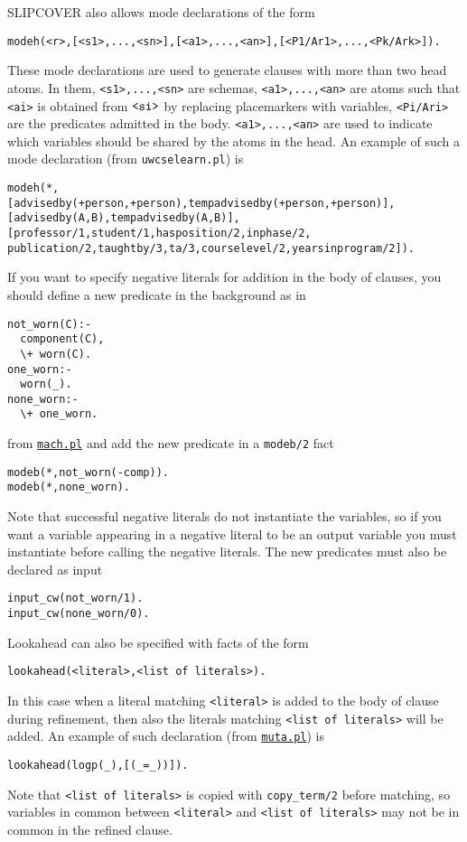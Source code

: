 SLIPCOVER also allows mode declarations of the form
\begin{verbatim}
modeh(<r>,[<s1>,...,<sn>],[<a1>,...,<an>],[<P1/Ar1>,...,<Pk/Ark>]). 
\end{verbatim}
These mode declarations are used to generate clauses with more than two head atoms. In them, \verb|<s1>,...,<sn>| are schemas,  \verb|<a1>,...,<an>| are atoms such that \verb|<ai>| is obtained from $\verb|<si>|$ by replacing placemarkers with variables, 
\verb|<Pi/Ari>| are the predicates admitted in the body. \verb|<a1>,...,<an>| are used to indicate which variables should be shared by the atoms in the head.
An example of such a mode declaration (from \texttt{uwcselearn.pl}) is
\begin{verbatim}
modeh(*,
[advisedby(+person,+person),tempadvisedby(+person,+person)],
[advisedby(A,B),tempadvisedby(A,B)],
[professor/1,student/1,hasposition/2,inphase/2,
publication/2,taughtby/3,ta/3,courselevel/2,yearsinprogram/2]).
\end{verbatim}
%
If you want to specify negative literals for addition in the body of clauses,
you should define a new predicate in the background as in
\begin{verbatim}
not_worn(C):-
  component(C),
  \+ worn(C).
one_worn:-
  worn(_).
none_worn:-
  \+ one_worn.
\end{verbatim}
from \href{http://cplint.lamping.unife.it/example/learning/mach.pl}{\texttt{mach.pl}} and add the new predicate in a \verb|modeb/2| fact
\begin{verbatim}
modeb(*,not_worn(-comp)).
modeb(*,none_worn).
\end{verbatim}
Note that successful negative literals do not instantiate the variables, so if you want
a variable appearing in a negative literal to be an output variable you must instantiate 
before calling the negative literals.
The new predicates must also be declared as input
\begin{verbatim}
input_cw(not_worn/1).
input_cw(none_worn/0).
\end{verbatim}
Lookahead can also be specified with facts of the form
\begin{verbatim}
lookahead(<literal>,<list of literals>).
\end{verbatim}
In this case when a literal matching \verb|<literal>| is added to the body of clause during refinement, then also
the literals matching \verb|<list of literals>| will be added.
An example of such declaration (from \href{http://cplint.lamping.unife.it/example/learning/muta.pl}{\texttt{muta.pl}}) is
\begin{verbatim}
lookahead(logp(_),[(_=_))]).
\end{verbatim}
Note that
\verb|<list of literals>| is copied with \verb|copy_term/2| before matching, so
variables in common between \verb|<literal>| and \verb|<list of literals>|
may not be in common in the refined clause.


